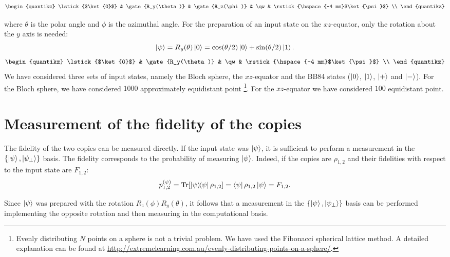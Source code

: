\[
\begin{quantikz}
    \lstick{$\ket{0}$} & \gate{R_y(\theta)}      & \gate{R_z(\phi)}      & \qw     & \rstick{\hspace{-4 mm}$\ket{\psi}$}  \\
\end{quantikz}
\]

where $\theta$ is the polar angle and $\phi$ is the azimuthal angle.
For the preparation of an input state on the $xz$-equator, only the rotation about the $y$ axis is needed:
\[
    \ket{\psi}=R_y(\theta)\ket{0}=\cos(\theta/2)\ket{0}+\sin(\theta/2)\ket{1}.
\]
\[
\begin{quantikz}
    \lstick{$\ket{0}$} & \gate{R_y(\theta)}   & \qw     & \rstick{\hspace{-4 mm}$\ket{\psi}$}  \\
\end{quantikz}
\]
We have considered three sets of input states, namely the Bloch sphere, the $xz$-equator and the BB84 states ($\ket{0}$, $\ket{1}$, $\ket{+}$ and $\ket{-}$).
For the Bloch sphere, we have considered $1000$ approximately equidistant point
\footnote{Evenly distributing $N$ points on a sphere is not a trivial problem. We have used the Fibonacci spherical lattice method. A detailed explanation can be found at \url{http://extremelearning.com.au/evenly-distributing-points-on-a-sphere/}.}.
 For the $xz$-equator we have considered $100$ equidistant point.
\section{Measurement of the fidelity of the copies}
The fidelity of the two copies can be measured directly. 
If the input state was $\ket{\psi}$, it is sufficient to perform a measurement in the $\{\ket{\psi},\ket{\psi_{\perp}}\}$ basis.
The fidelity corresponds to the probability of measuring $\ket{\psi}$.
Indeed, if the copies are $\rho_{1,2}$ and their fidelities with respect to the input state are $F_{1,2}$:
\[
    p_{1,2}^{(\psi)}=\Tr[\ketbra{\psi}{\psi} \rho_{1,2}]=\bra{\psi}\rho_{1,2}\ket{\psi}=F_{1,2}.
\]

Since $\ket{\psi}$ was prepared with the rotation $R_z(\phi)R_y(\theta)$, 
it follows that a measurement in the $\left\{\ket{\psi},\ket{\psi_{\perp}}\right\}$ basis can be performed implementing the opposite rotation and then measuring in the computational basis.

